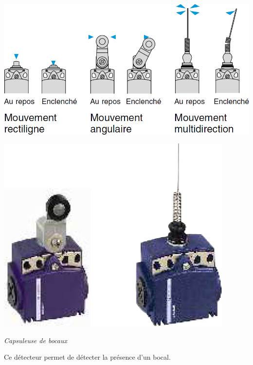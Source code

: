 \documentclass[10pt]{article}
\begin{document}
\begin{minipage}[c]{.6\linewidth}
\begin{center}
    \includegraphics[width=.9\textwidth]{images/interrupteur_position}
\end{center}
\end{minipage}\hfill
\begin{minipage}[c]{.25\linewidth}
\begin{center}
    \includegraphics[width=.9\textwidth]{images/interrupteur_position_2}
\end{center}
\end{minipage}

\begin{exemple}
\textit{Capsuleuse de bocaux}

Ce détecteur permet de détecter la présence d'un bocal.
\end{exemple}
\end{document}
